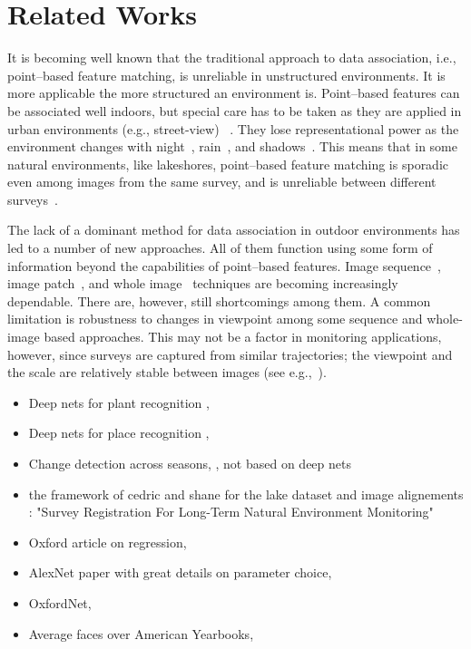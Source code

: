 \section{Related Works}

It is becoming well known that the traditional approach to data association, i.e., point--based feature matching, is unreliable in unstructured environments. It is more applicable the more structured an environment is. Point--based features can be associated well indoors, but special care has to be taken as they are applied in urban environments (e.g., street-view) ~\cite{beall2014, stumm2013}. They lose representational power as the environment changes with night~\cite{nelson2015}, rain~\cite{cord2014}, and shadows~\cite{corke2013}. This means that in some natural environments, like lakeshores, point--based feature matching is sporadic even among images from the same survey, and is unreliable between different surveys~\cite{griffith2014iser}. 

The lack of a dominant method for data association in outdoor environments has led to a number of new approaches. All of them function using some form of information beyond the capabilities of point--based features. Image sequence~\cite{milford2012seqslam, cummins2008fab, milford2004, churchill2013, naseer2015}, image patch~\cite{mcmanus2014, sunderhauf2015}, and whole image~\cite{arroyo2015, neubert2015superpixel} techniques are becoming increasingly dependable. There are, however, still shortcomings among them. A common limitation is robustness to changes in viewpoint among some sequence and whole-image based approaches. This may not be a factor in monitoring applications, however, since surveys are captured from similar trajectories; the viewpoint and the scale are relatively stable between images (see e.g.,~\cite{milford2014}).

\begin{itemize}
    \item Deep nets for plant recognition \cite{Reyes2015},
    \item Deep nets for place recognition \cite{Sunderhauf2015},
    \item Change detection across seasons, \cite{Neubert2013}, not based on deep nets
    \item the framework of cedric and shane for the lake dataset and image alignements : "Survey Registration For Long-Term Natural Environment Monitoring"
    \item Oxford article on regression, \cite{conf/accv/PfisterSCZ14}
    \item AlexNet paper with great details on parameter choice, \cite{NIPS2012_4824}
    \item OxfordNet, \cite{Simonyan14c}
    \item Average faces over American Yearbooks, \cite{ginosar2015century}
\end{itemize}

